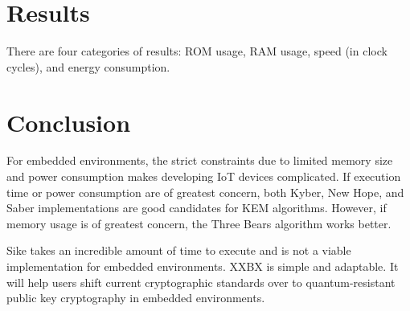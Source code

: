 \documentclass[10pt]{article}
\begin{document}
\section{Results}

There are four categories of results: ROM usage, RAM usage, speed (in clock cycles), 
and energy consumption.

\section{Conclusion}

For embedded environments, the strict constraints due to limited memory size and power 
consumption makes developing IoT devices complicated. If execution time or power consumption 
are of greatest concern, both Kyber, New Hope, and Saber implementations are good candidates 
for KEM algorithms. However, if memory usage is of greatest concern, the Three Bears algorithm 
works better.

Sike takes an incredible amount of time to execute and is not a viable implementation for 
embedded environments.
XXBX is simple and adaptable. It will help users shift current cryptographic standards over 
to quantum-resistant public key cryptography in embedded environments.




\end{document}
